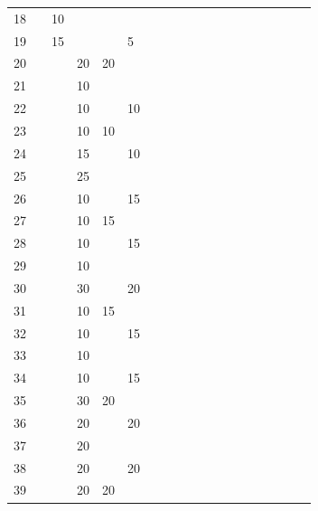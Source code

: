 \begin{table}[t]
\begin{center}
\begin{tabular}{r g c g c g c g c g c g c g c g c g c}
   18 &    & 10 &    &    &    & & & &   &    &    &    &    &    &   &   &   & \\
   19 &    & 15 &    &    &  5 & & & &   &    &    &    &    &    &   &   &   & \\
   20 &    &    & 20 & 20 &    & & & &   &    &    &    &    &    &   &   &   & \\
   21 &    &    & 10 &    &    & & & &   &    &    &    &    &    &   &   &   & \\
   22 &    &    & 10 &    & 10 & & & &   &    &    &    &    &    &   &   &   & \\
   23 &    &    & 10 & 10 &    & & & &   &    &    &    &    &    &   &   &   & \\
   24 &    &    & 15 &    & 10 & & & &   &    &    &    &    &    &   &   &   & \\
   25 &    &    & 25 &    &    & & & &   &    &    &    &    &    &   &   &   & \\
   26 &    &    & 10 &    & 15 & & & &   &    &    &    &    &    &   &   &   & \\
   27 &    &    & 10 & 15 &    & & & &   &    &    &    &    &    &   &   &   & \\
   28 &    &    & 10 &    & 15 & & & &   &    &    &    &    &    &   &   &   & \\
   29 &    &    & 10 &    &    & & & &   &    &    &    &    &    &   &   &   & \\
   30 &    &    & 30 &    & 20 & & & &   &    &    &    &    &    &   &   &   & \\
   31 &    &    & 10 & 15 &    & & & &   &    &    &    &    &    &   &   &   & \\
   32 &    &    & 10 &    & 15 & & & &   &    &    &    &    &    &   &   &   & \\
   33 &    &    & 10 &    &    & & & &   &    &    &    &    &    &   &   &   & \\
   34 &    &    & 10 &    & 15 & & & &   &    &    &    &    &    &   &   &   & \\
   35 &    &    & 30 & 20 &    & & & &   &    &    &    &    &    &   &   &   & \\
   36 &    &    & 20 &    & 20 & & & &   &    &    &    &    &    &   &   &   & \\
   37 &    &    & 20 &    &    & & & &   &    &    &    &    &    &   &   &   & \\
   38 &    &    & 20 &    & 20 & & & &   &    &    &    &    &    &   &   &   & \\
   39 &    &    & 20 & 20 &    & & & &   &    &    &    &    &    &   &   &   & \\

\end{tabular}
\end{center}
\end{table}
